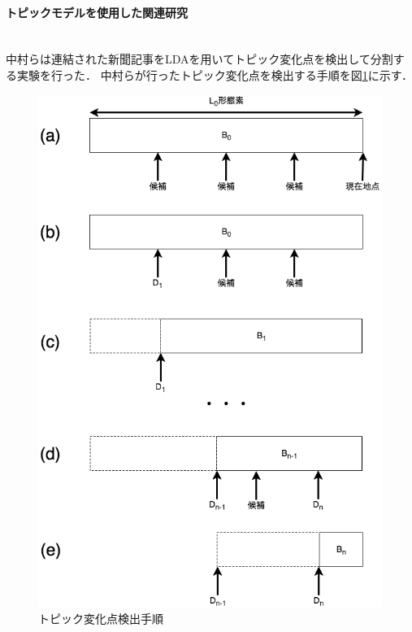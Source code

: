 \paragraph{トピックモデルを使用した関連研究}\ \\
中村ら\cite{topicLDAshift}は連結された新聞記事をLDAを用いてトピック変化点を検出して分割する実験を行った．
中村らが行ったトピック変化点を検出する手順を図\ref{Fig:LDA-topicFlow}に示す．
\begin{figure}[htbp]
 \begin{center}
  \includegraphics[width=\textwidth]{../images/2.Related_Work/LDA-topicFlow.png}
  \caption{トピック変化点検出手順}
  \label{Fig:LDA-topicFlow}
  \vspace{-10pt}
 \end{center}
\end{figure}

